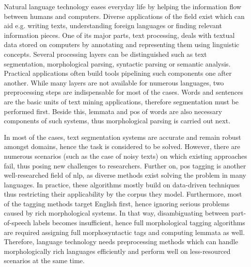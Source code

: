
Natural language technology eases everyday life by helping the information flow between humans and computers.
Diverse applications of the field exist which can aid e.g. writing texts, understanding foreign languages or finding relevant information pieces.
One of its major parts, text processing, deals with textual data stored on computers by annotating and representing them using linguistic concepts.
Several processing layers can be distinguished such as text segmentation, morphological parsing, syntactic parsing or semantic analysis.
Practical applications often build tools pipelining such components one after another. 
While many layers are not available for numerous languages, two preprocessing steps are indispensable for most of the cases.
Words and sentences are the basic units of text mining applications, therefore segmentation must be performed first.
Beside this, lemmata and \gls{pos} of words are also necessary components of such systems, thus morphological parsing is carried out next.

In most of the cases, text segmentation systems are accurate and remain robust amongst domains, hence the task is considered to be solved.
However, there are numerous scenarios (such as the case of noisy texts) on which existing approaches fail, thus posing new challenges to researchers.
Further on, \acrshort{pos} tagging is another well-researched field of \gls{nlp}, as diverse methods exist solving the problem in many languages. 
In practice, these algorithms mostly build on data-driven techniques thus restricting their applicability by the corpus they model.
Furthermore, most of the tagging methods target English first, hence ignoring serious problems caused by rich morphological systems.
In that way, disambiguating between part-of-speech labels becomes insufficient, hence full morphological tagging algorithms are required assigning full morphosyntactic tags and computing lemmata as well.
Therefore, language technology needs preprocessing methods which can handle morphologically rich languages efficiently 
and perform well on less-resourced scenarios at the same time.


